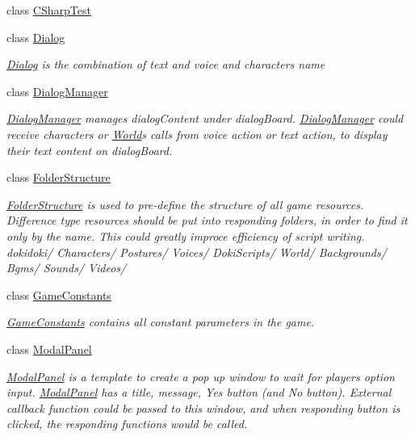 \begin{DoxyCompactItemize}
class \hyperlink{classdoki_unity_1_1_c_sharp_test}{C\+Sharp\+Test}
\item 
class \hyperlink{classdoki_unity_1_1_dialog}{Dialog}
\begin{DoxyCompactList}\small\item\em \hyperlink{classdoki_unity_1_1_dialog}{Dialog} is the combination of text and voice and character\textquotesingle{}s name \end{DoxyCompactList}\item 
class \hyperlink{classdoki_unity_1_1_dialog_manager}{Dialog\+Manager}
\begin{DoxyCompactList}\small\item\em \hyperlink{classdoki_unity_1_1_dialog_manager}{Dialog\+Manager} manages dialog\+Content under dialog\+Board. \hyperlink{classdoki_unity_1_1_dialog_manager}{Dialog\+Manager} could receive characters\textquotesingle{} or \hyperlink{classdoki_unity_1_1_world}{World}\textquotesingle{}s calls from voice action or text action, to display their text content on dialog\+Board. \end{DoxyCompactList}\item 
class \hyperlink{classdoki_unity_1_1_folder_structure}{Folder\+Structure}
\begin{DoxyCompactList}\small\item\em \hyperlink{classdoki_unity_1_1_folder_structure}{Folder\+Structure} is used to pre-\/define the structure of all game resources. Difference type resources should be put into responding folders, in order to find it only by the name. This could greatly improce efficiency of script writing. dokidoki/ Characters/ Postures/ Voices/ Doki\+Scripts/ World/ Backgrounds/ Bgms/ Sounds/ Videos/ \end{DoxyCompactList}\item 
class \hyperlink{classdoki_unity_1_1_game_constants}{Game\+Constants}
\begin{DoxyCompactList}\small\item\em \hyperlink{classdoki_unity_1_1_game_constants}{Game\+Constants} contains all constant parameters in the game. \end{DoxyCompactList}\item 
class \hyperlink{classdoki_unity_1_1_modal_panel}{Modal\+Panel}
\begin{DoxyCompactList}\small\item\em \hyperlink{classdoki_unity_1_1_modal_panel}{Modal\+Panel} is a template to create a pop up window to wait for player\textquotesingle{}s option input. \hyperlink{classdoki_unity_1_1_modal_panel}{Modal\+Panel} has a title, message, Yes button (and No button). External callback function could be passed to this window, and when responding button is clicked, the responding functions would be called. \end{DoxyCompactList}\item 

\end{DoxyCompactItemize}

